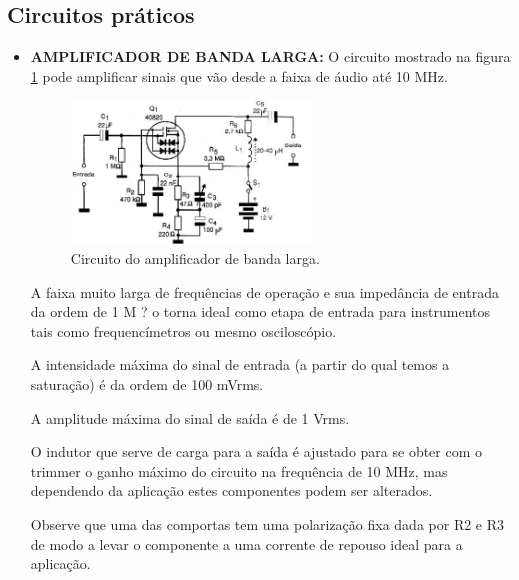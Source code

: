 \documentclass[12pt]{article}
\begin{document}
        \subsection{Circuitos práticos}

            \begin{itemize}

                \item \textbf{AMPLIFICADOR DE BANDA LARGA:} O circuito mostrado na figura \ref{fig:amplificador} pode amplificar sinais que vão desde a faixa de áudio até 10 MHz.
                
                    \begin{figure}[htpb!]
                        
                        \centering
                        \includegraphics[width=0.6\textwidth]{./images/Amplificador banda larga.jpg}
                        \caption{Circuito do amplificador de banda larga.}
                        \label{fig:amplificador}

                    \end{figure}
                A faixa muito larga de frequências de operação e sua impedância de entrada da ordem de 1 M ? o torna ideal como etapa de entrada para instrumentos tais como frequencímetros ou mesmo osciloscópio.

                A intensidade máxima do sinal de entrada (a partir do qual temos a saturação) é da ordem de 100 mVrms.

                A amplitude máxima do sinal de saída é de 1 Vrms.

                O indutor que serve de carga para a saída é ajustado para se obter com o trimmer o ganho máximo do circuito na frequência de 10 MHz, mas dependendo da aplicação estes componentes podem ser alterados.

                Observe que uma das comportas tem uma polarização fixa dada por R2 e R3 de modo a levar o componente a uma corrente de repouso ideal para a aplicação.


\end{itemize}
\end{document}
